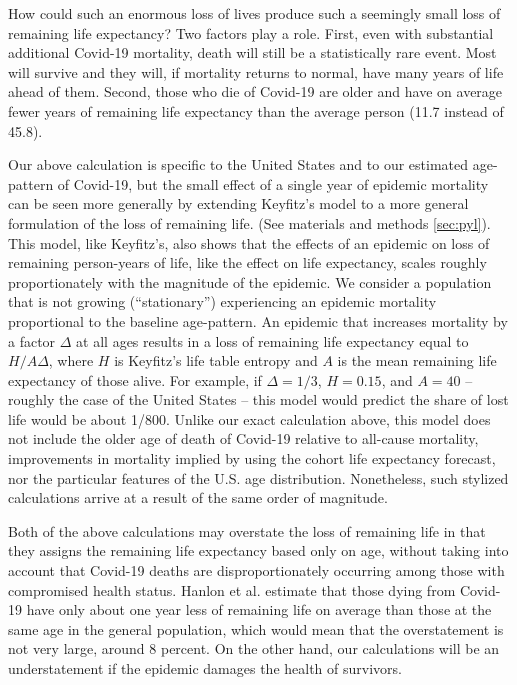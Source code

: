 \documentclass[9pt,twocolumn,twoside,lineno]{pnas-new}
\begin{document}
How could such an enormous loss of lives produce such a seemingly
small loss of remaining life expectancy? Two factors play a
role. First, even with substantial additional Covid-19 mortality, death will still
be a statistically rare event. Most will survive and they will, if
mortality returns to normal, have many years of life ahead of
them. Second, those who die of Covid-19 are older and have on average
fewer years of remaining life expectancy than the average person (11.7
instead of 45.8).

Our above calculation is specific to the United States and to our
estimated age-pattern of Covid-19, but the small effect of a single
year of epidemic mortality can be seen more generally by extending
Keyfitz's model to a more general formulation of the loss of remaining
life. (See materials and methods \ref{sec:pyl}). This model, like Keyfitz's, also
shows that the effects of an epidemic on loss of remaining
person-years of life, like the effect on life expectancy, scales
roughly proportionately with the magnitude of the epidemic.  We consider a
population that is not growing (``stationary'') experiencing an
epidemic mortality proportional to the baseline age-pattern. An
epidemic that increases mortality by a factor $\Delta$ at all ages
results in a loss of remaining life expectancy equal to
$ H / A \Delta$, where $H$ is Keyfitz’s life table entropy and $A$ is
the mean remaining life expectancy of those alive. For example, if
$\Delta = 1/3$, $H = 0.15$, and $A = 40$ -- roughly the case of the
United States -- this model would predict the share of lost life would
be about 1/800. Unlike our exact calculation above, this model does
not include the older age of death of Covid-19 relative to all-cause mortality,
improvements in mortality implied by using the cohort life expectancy forecast, nor the
particular features of the U.S. age distribution. Nonetheless, such
stylized calculations arrive at a result of the same order of
magnitude.

Both of the above calculations may overstate the loss of remaining
life in that they assigns the remaining life expectancy based only on
age, without taking into account that Covid-19 deaths are
disproportionately occurring among those with compromised health
status. Hanlon et al. \cite{hanlon:2020} estimate that those dying
from Covid-19 have only about one year less of remaining life on
average than those at the same age in the general population, which
would mean that the overstatement is not very large, around 8
percent. On the other hand, our calculations will be an understatement
if the epidemic damages the health of survivors.
\end{document}

